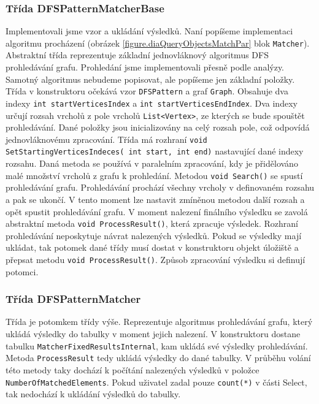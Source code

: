 \subsubsection{Třída DFSPatternMatcherBase}

Implementovali jsme vzor a ukládání výsledků.
Naní popíšeme implementaci algoritmu procházení (obrázek \ref{figure.diaQueryObjectsMatchPar} blok \texttt{Matcher}).
Abstraktní třída reprezentuje základní jednovláknový algoritmus DFS prohledávání grafu.
Prohledání jsme implementovali přesně podle analýzy.
Samotný algoritmus nebudeme popisovat, ale popíšeme jen základní položky.
Třída v konstruktoru očekává vzor \texttt{DFSPattern} a graf \texttt{Graph}.
Obsahuje dva indexy \texttt{int startVerticesIndex} a \texttt{int startVerticesEndIndex}.
Dva indexy určují rozsah vrcholů z pole vrcholů \texttt{List<Vertex>}, ze kterých se bude spouštět prohledávání.
Dané položky jsou inicializovány na celý rozsah pole, což odpovídá jednovláknovému zpracování.
Třída má rozhraní \texttt{void SetStartingVerticesIndeces( int start, int end)} nastavující dané indexy rozsahu.
Daná metoda se používá v paralelním zpracování, kdy je přidělováno malé množství vrcholů z grafu k prohledání.
Metodou \texttt{void Search()} se spustí prohledávání grafu.
Prohledávání prochází všechny vrcholy v definovaném rozsahu a pak se ukončí.
V tento moment lze nastavit zmíněnou metodou další rozsah a opět spustit prohledávání grafu.
V moment nalezení finálního výsledku se zavolá abstraktní metoda \texttt{void ProcessResult()}, která zpracuje výsledek.
Rozhraní prohledávání neposkytuje návrat nalezených výsledků.
Pokud se výsledky mají ukládat, tak potomek dané třídy musí dostat v konstruktoru objekt úložiště a přepsat metodu \texttt{void ProcessResult()}.
Způsob zpracování výsledku si definují potomci.

\subsubsection{Třída DFSPatternMatcher}

Třída je potomkem třídy výše.
Reprezentuje algoritmus prohledávání grafu, který ukládá výsledky do tabulky v moment jejich nalezení.
V konstruktoru dostane tabulku \texttt{MatcherFixedResultsInternal}, kam ukládá své výsledky prohledávání.
Metoda \texttt{ProcessResult} tedy ukládá výsledky do dané tabulky.
V průběhu volání této metody taky dochází k počítání nalezených výsledků v položce \texttt{NumberOfMatchedElements}.
Pokud uživatel zadal pouze \texttt{count(*)} v části Select, tak nedochází k ukládání výsledků do tabulky.

